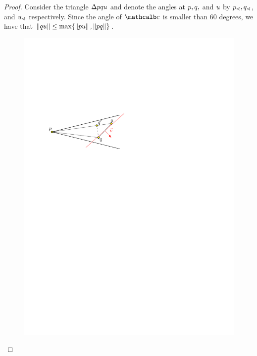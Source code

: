 \documentclass[12pt]{article}%
\begin{document}
\begin{proof}
    Consider the triangle $\Delta pqu$ and denote the angles at
    $p,q,$ and $u$ by $p_\sphericalangle,q_\sphericalangle$, and $u_\sphericalangle$
    respectively.  Since the angle of $\cone$ is smaller than $60$
    degrees, we have that
    $\left\| q u \right\|\leq \max \{\left\| p u \right\|,\left\| p q \right\|\}$.
    
    \begin{figure}[h]
        \centering%
        \includegraphics{figs/triangle_cone_edge}
        \caption{}%
    \end{figure}


\end{proof}
\end{document}
